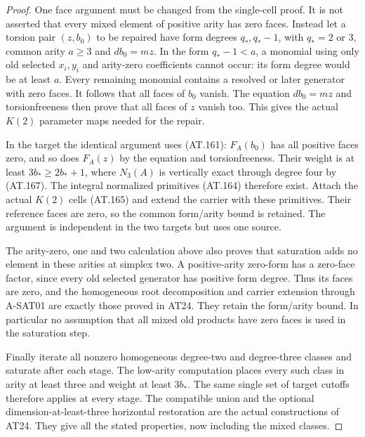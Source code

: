\begin{proof}
One face argument must be changed from the
single-cell proof.
It is not asserted that every mixed element
of positive arity has zero faces.
Instead let a torsion pair $(z,b_0)$ to be
repaired have form degrees $q_*,q_*-1$, with
$q_*=2$ or $3$, common arity $a\geq3$ and
$db_0=mz$.
In the form $q_*-1<a$, a monomial using only
old selected $x_i,y_i$ and arity-zero coefficients
cannot occur: its form degree would be at
least $a$.
Every remaining monomial contains a resolved
or later generator with zero faces.
It follows that all faces of $b_0$ vanish.
The equation $db_0=mz$ and torsionfreeness
then prove that all faces of $z$ vanish too.
This gives the actual $K(2)$ parameter maps
needed for the repair.

In the target the identical argument uses
(AT.161): $F_A(b_0)$ has all positive faces
zero, and so does $F_A(z)$ by the equation
and torsionfreeness.
Their weight is at least $3b_*\geq2b_*+1$,
where $N_3(A)$ is vertically exact through
degree four by (AT.167).
The integral normalized primitives (AT.164)
therefore exist. Attach the actual $K(2)$
cells (AT.165) and extend the carrier with
these primitives. Their reference faces
are zero, so the common form/arity bound
is retained. The argument is independent
in the two targets but uses one source.

The arity-zero, one and two calculation above
also proves that saturation adds no element
in these arities at simplex two.
A positive-arity zero-form has a zero-face
factor, since every old selected generator
has positive form degree.
Thus its faces are zero, and the homogeneous
root decomposition and carrier extension
through A-SAT01 are exactly those proved
in AT24. They retain the form/arity bound.
In particular no assumption that all mixed
old products have zero faces is used in
the saturation step.

Finally iterate all nonzero homogeneous
degree-two and degree-three classes and
saturate after each stage.
The low-arity computation places every
such class in arity at least three and
weight at least $3b_*$.
The same single set of target cutoffs
therefore applies at every stage.
The compatible union and the optional
dimension-at-least-three horizontal
restoration are the actual constructions
of AT24. They give all the stated
properties, now including the mixed
classes.
\end{proof}

